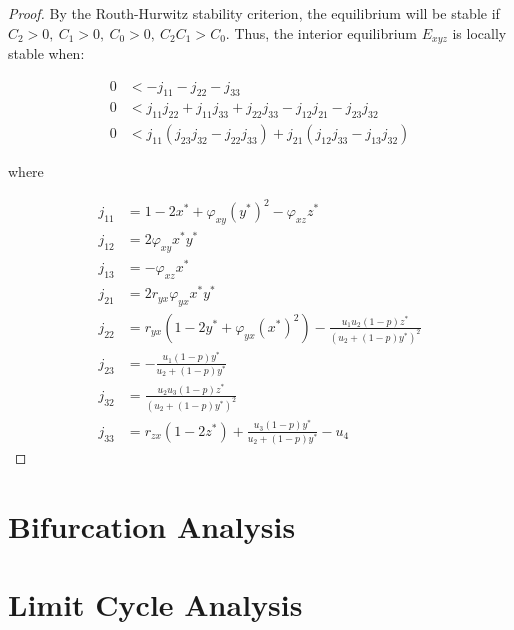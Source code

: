 \begin{proof}
    By the Routh-Hurwitz stability criterion, the equilibrium will be stable if $C_2>0,\ C_1>0,\ C_0>0,\ C_2C_1>C_0$. Thus, the interior equilibrium $E_{xyz}$ is locally stable when:

    \begin{align*}
        0 &< -j_{11}-j_{22}-j_{33}\\
        0 &< j_{11}j_{22}+j_{11}j_{33}+j_{22}j_{33}-j_{12}j_{21}-j_{23}j_{32}\\
        0 &< j_{11}\left(j_{23}j_{32}-j_{22}j_{33}\right)+j_{21}\left(j_{12}j_{33}-j_{13}j_{32}\right)
    \end{align*}

    where
    
    \begin{align*}
        j_{11} &= 1-2x^*+\varphi_{xy}\left(y^*\right)^2-\varphi_{xz}z^*\\
        j_{12} &= 2\varphi_{xy}x^*y^*\\
        j_{13} &= -\varphi_{xz}x^*\\
        j_{21} &= 2r_{yx}\varphi_{yx}x^*y^*\\
        j_{22} &= r_{yx}\left(1-2y^*+\varphi_{yx}\left(x^*\right)^2\right)-\frac{u_1u_2\left(1-p\right)z^*}{\left(u_2+\left(1-p\right)y^*\right)^2}\\
        j_{23} &= -\frac{u_1\left(1-p\right)y^*}{u_2+\left(1-p\right)y^*}\\
        j_{32} &= \frac{u_2u_3\left(1-p\right)z^*}{\left(u_2+\left(1-p\right)y^*\right)^2}\\
        j_{33} &= r_{zx}\left(1-2z^*\right)+\frac{u_3\left(1-p\right)y^*}{u_2+\left(1-p\right)y^*}-u_4
    \end{align*}
\end{proof}

\section{Bifurcation Analysis}
\section{Limit Cycle Analysis}
